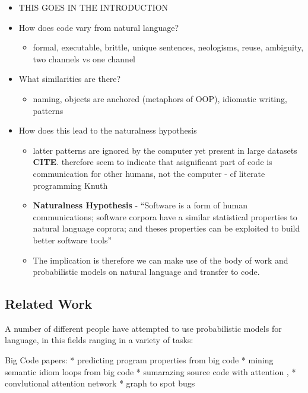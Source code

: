 \begin{itemize}
    \item THIS GOES IN THE INTRODUCTION
    \item How does code vary from natural language?
        \begin{itemize}
            \item formal, executable, brittle, unique sentences, neologisms, reuse, ambiguity, two channels vs one channel
        \end{itemize}
    \item What similarities are there?
        \begin{itemize}
            \item naming, objects are anchored (metaphors of OOP), idiomatic writing, patterns
        \end{itemize}
    \item How does this lead to the naturalness hypothesis
        \begin{itemize}
            \item latter patterns are ignored by the computer yet present in large datasets \textbf{CITE}. 
            therefore seem to indicate that asignificant part of code is communication for other humans, not the computer - cf literate programming Knuth
            \item \textbf{Naturalness Hypothesis} - ``Software is a form of human communications; software corpora have a similar statistical properties to natural language coprora; and theses properties can be exploited to build better software tools'' 
            \item The implication is therefore we can make use of the body of work and probabilistic models on natural language and transfer to code.
        \end{itemize}
\end{itemize}


\subsection{Related Work} %
\label{ssub:related work}

A number of different people have attempted to use probabilistic models for language, in this fields ranging in a variety of tasks:

Big Code papers:
* predicting program properties from big code
* mining semantic idiom loops from big code
* sumarazing source code with attention ,
* convlutional attention network
* graph to spot bugs

